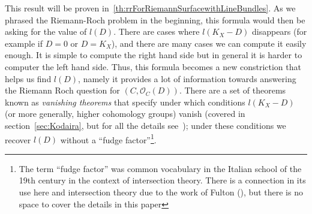 \documentclass{book}
\newcommand{\CO}{{\mathcal{O}}}
\begin{document}
This result will be proven in~\cref{th:rrForRiemannSurfacewithLineBundles}. As we phrased the Riemann-Roch
problem in the beginning, this formula would then be asking for the value of $l(D)$. There are cases where
$l(K_X-D)$ disappears (for example if $D = 0$ or $D = K_X$), and there are many cases we can compute it easily
enough. It is simple to compute the right hand side but in general it is harder to computer the left hand
side. Thus, this formula becomes a new constriction that helps us find $l(D)$, namely it provides a lot of
information towards answering the Riemann Roch question for $(C, \CO_C(D))$. There are a set of theorems known
as \emph{vanishing theorems} that specify under which conditions $l(K_X-D)$ (or more generally, higher
cohomology groups) vanish (covered in section~\ref{sec:Kodaira}, but for all the details
see~\cite{deligneRelevementsModulop2etDecomposition1987}); under these conditions we recover $l(D)$ without a
``fudge factor''\footnote{The term ``fudge factor'' was common vocabulary in the Italian school of the 19th
  century in the context of intersection theory. There is a connection in its use here and intersection theory
  due to the work of Fulton (\cite{fultonIntersectionTheory1984}), but there is no space to cover the details
  in this paper}.
\end{document}
